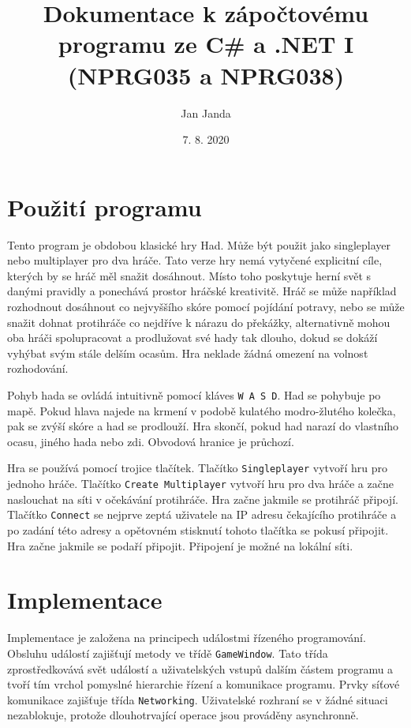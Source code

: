 \documentclass[12pt]{article}
\title{Dokumentace k zápočtovému programu ze C\# a .NET I (NPRG035 a NPRG038)}
\date{7. 8. 2020}
\author{Jan Janda}
\begin{document}
 \maketitle
 
 \section*{Použití programu}

 Tento program je obdobou klasické hry Had. Může být použit jako singleplayer nebo multiplayer pro dva hráče. Tato verze hry nemá vytyčené explicitní cíle, kterých by se hráč měl snažit dosáhnout. Místo toho poskytuje herní svět s danými pravidly a ponechává prostor hráčské kreativitě. Hráč se může například rozhodnout dosáhnout co nejvyššího skóre pomocí pojídání potravy, nebo se může snažit dohnat protihráče co nejdříve k nárazu do překážky, alternativně mohou oba hráči spolupracovat a prodlužovat své hady tak dlouho, dokud se dokáží vyhýbat svým stále delším ocasům. Hra neklade žádná omezení na volnost rozhodování.
 
 Pohyb hada se ovládá intuitivně pomocí kláves \texttt{W A S D}. Had se pohybuje po mapě. Pokud hlava najede na krmení v podobě kulatého modro-žlutého kolečka, pak se zvýší skóre a had se prodlouží. Hra skončí, pokud had narazí do vlastního ocasu, jiného hada nebo zdi. Obvodová hranice je průchozí.
 
 Hra se používá pomocí trojice tlačítek. Tlačítko \texttt{Singleplayer} vytvoří hru pro jednoho hráče. Tlačítko \texttt{Create Multiplayer} vytvoří hru pro dva hráče a začne naslouchat na síti v očekávání protihráče. Hra začne jakmile se protihráč připojí. Tlačítko \texttt{Connect} se nejprve zeptá uživatele na IP adresu čekajícího protihráče a po zadání této adresy a opětovném stisknutí tohoto tlačítka se pokusí připojit. Hra začne jakmile se podaří připojit. Připojení je možné na lokální síti.
 
 \section*{Implementace}
 
 Implementace je založena na principech událostmi řízeného programování. Obsluhu událostí zajišťují metody ve třídě \texttt{GameWindow}. Tato třída zprostředkovává svět událostí a uživatelských vstupů dalším částem programu a tvoří tím vrchol pomyslné hierarchie řízení a komunikace programu. Prvky síťové komunikace zajišťuje třída \texttt{Networking}. Uživatelské rozhraní se v žádné situaci nezablokuje, protože dlouhotrvající operace jsou prováděny asynchronně.
 
\end{document}
